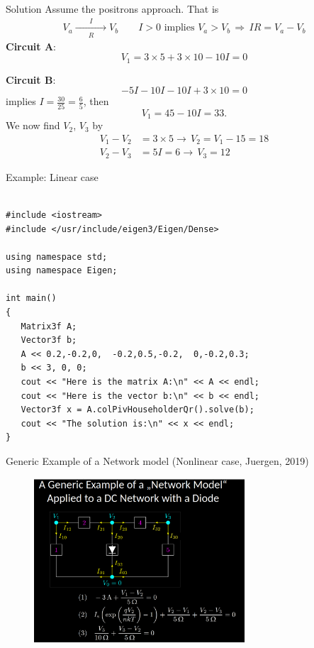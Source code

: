 \documentclass[xcolor=dvipsnames]{beamer}
\begin{document}
\begin{frame}{Solution}
Assume the positrons approach. That is
\begin{align*}
V_a	\xrightarrow[R]{\qquad I \qquad} V_b \qquad I>0\,\,\text{implies}\,\,V_a>V_b\,\Longrightarrow\, IR=V_a-V_b
\end{align*}
	\textbf{Circuit A}:
\[	V_1 = 3\times 5 + 3\times 10 -10 I =0 \]

	\textbf{Circuit B}:
\[	-5I - 10 I -10 I +3\times 10 =0 \]
implies $I=\frac{30}{25}=\frac{6}{5}$, then
\[V_1 = 45 - 10I=33.\]
We now find $V_2$, $V_3$ by 
\begin{align*}
	V_1 - V_2 &= 3\times 5 \rightarrow\, V_2 = V_1 - 15 = 18\\
	V_2 - V_3 &= 5I = 6 \rightarrow\, V_3 = 12
\end{align*}
\end{frame}


\begin{frame}[fragile,shrink=30]{Example: Linear case}
\begin{verbatim}

#include <iostream>
#include </usr/include/eigen3/Eigen/Dense>
 
using namespace std;
using namespace Eigen;
 
int main()
{
   Matrix3f A;
   Vector3f b;
   A << 0.2,-0.2,0,  -0.2,0.5,-0.2,  0,-0.2,0.3;
   b << 3, 0, 0;
   cout << "Here is the matrix A:\n" << A << endl;
   cout << "Here is the vector b:\n" << b << endl;
   Vector3f x = A.colPivHouseholderQr().solve(b);
   cout << "The solution is:\n" << x << endl;
}
\end{verbatim}
\end{frame}

\begin{frame}{Generic Example of a Network model (Nonlinear case, Juergen, 2019)}
     	     \begin{figure}[!ht]
  			\centering
    		\includegraphics[width=0.7\textwidth]{diode.png}
    		\label{fig:juergen2}
    	 \end{figure}
\end{frame}
\end{document}
